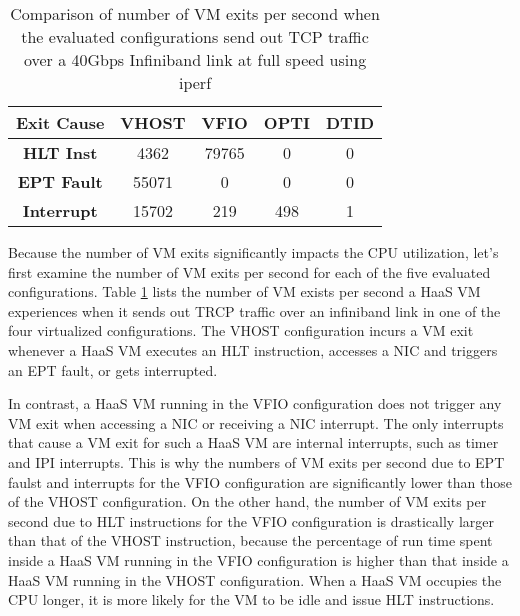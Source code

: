 \begin{table}
\renewcommand{\arraystretch}{1.2}
\small
\begin{center}
\begin{tabular}{|c|c|c|c|c|} \hline
{\bf Exit Cause} & {\bf VHOST } & {\bf VFIO} & {\bf OPTI} & {\bf DTID} \\ \hline
 {\bf HLT Inst}    & 4362  & 79765 & 0    & 0    \\ \hline
 {\bf EPT Fault}  & 55071 & 0     & 0    & 0    \\ \hline
{\bf Interrupt}   & 15702 & 219   & 498  & 1    \\ \hline
\end{tabular}
\end{center}
\vspace{-0.1in}
\caption{Comparison of number of VM exits per second when the evaluated 
configurations send out TCP traffic over a
40Gbps Infiniband link at full speed using iperf}
\label{tab:vm_exit}
\vspace{-0.1in}
\end{table}

Because the number of VM exits significantly impacts the CPU utilization, 
let's first examine the number of VM exits per second for each of the five 
evaluated configurations. 
Table \ref{tab:vm_exit}  lists the number of VM exists per second a HaaS VM experiences 
when it sends out TRCP traffic over an infiniband link in one of the four virtualized 
configurations. 
The VHOST configuration incurs a VM exit whenever a HaaS VM executes an HLT instruction,
accesses a NIC and triggers an EPT fault, or gets interrupted. 

In contrast, a HaaS VM running in the VFIO configuration does not trigger any VM exit when
accessing a NIC or receiving a NIC interrupt.
The only interrupts that cause a VM exit for such a HaaS VM are internal interrupts, such
as timer and IPI interrupts.
This is why the numbers of VM exits per second due to EPT faulst and interrupts  for the VFIO 
configuration are significantly lower than those of the VHOST configuration.
On the other hand, the number of VM exits per second due to HLT instructions for the VFIO configuration
is drastically larger than that of the VHOST instruction, because 
the percentage of run time spent inside a HaaS VM running in the VFIO configuration 
is higher than that inside a HaaS VM running in the VHOST configuration.
When a HaaS VM occupies the CPU longer, it is more likely for the VM to be idle and issue HLT instructions.

